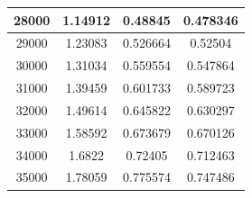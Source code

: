 \begin{center}
\begin{tabular}{| c | c | c | c |}
28000 & 1.14912 & 0.48845 & 0.478346 \\ \hline
29000 & 1.23083 & 0.526664 & 0.52504 \\ \hline
30000 & 1.31034 & 0.559554 & 0.547864 \\ \hline
31000 & 1.39459 & 0.601733 & 0.589723 \\ \hline
32000 & 1.49614 & 0.645822 & 0.630297 \\ \hline
33000 & 1.58592 & 0.673679 & 0.670126 \\ \hline
34000 & 1.6822 & 0.72405 & 0.712463 \\ \hline
35000 & 1.78059 & 0.775574 & 0.747486 \\ \hline
\hline
\end{tabular}
\end{center}
